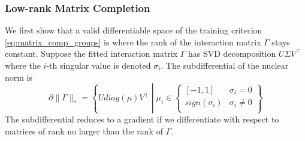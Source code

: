 \documentclass[12pt,letterpaper]{article}
\begin{document}
\subsubsection{Low-rank Matrix Completion}
We first show that a valid differentiable space of the training criterion \eqref{eq:matrix_comp_groups} is where the rank of the interaction matrix $\Gamma$ stays constant. Suppose the fitted interaction matrix $\Gamma$ has SVD decomposition $U\Sigma V^\top$ where the $i$-th singular value is denoted $\sigma_i$. The subdifferential of the nuclear norm is
\begin{equation}
\partial \| \Gamma \|_* = 
\left \{
U diag(\mu) V^\top \middle | 
\mu_i \in 
\begin{cases}
[-1, 1] & \sigma_i = 0\\
sign(\sigma_i) & \sigma_i \ne 0\\
\end{cases}
\right \}
\end{equation}
The subdifferential reduces to a gradient if we differentiate with respect to  matrices of rank no larger than the rank of $\Gamma$.
\end{document}

